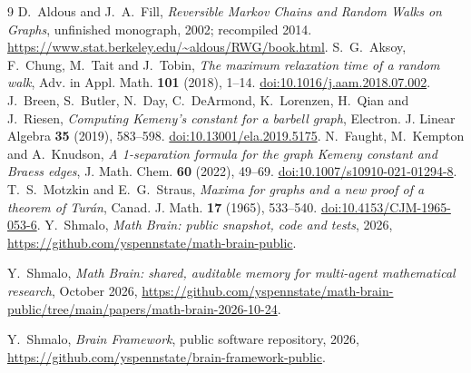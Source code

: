 \documentclass[11pt]{amsart}
\numberwithin{equation}{section}
\theoremstyle{remark}
\begin{document}
\begin{thebibliography}{9}
D.~Aldous and J.~A.~Fill, \emph{Reversible Markov Chains and Random Walks on Graphs}, unfinished monograph, 2002; recompiled 2014. \url{https://www.stat.berkeley.edu/~aldous/RWG/book.html}.
S.~G.~Aksoy, F.~Chung, M.~Tait and J.~Tobin, \emph{The maximum relaxation time of a random walk}, Adv. in Appl. Math. \textbf{101} (2018), 1--14. \href{https://doi.org/10.1016/j.aam.2018.07.002}{doi:10.1016/j.aam.2018.07.002}.
J.~Breen, S.~Butler, N.~Day, C.~DeArmond, K.~Lorenzen, H.~Qian and J.~Riesen, \emph{Computing Kemeny's constant for a barbell graph}, Electron. J. Linear Algebra \textbf{35} (2019), 583--598. \href{https://doi.org/10.13001/ela.2019.5175}{doi:10.13001/ela.2019.5175}.
N.~Faught, M.~Kempton and A.~Knudson, \emph{A 1-separation formula for the graph Kemeny constant and Braess edges}, J. Math. Chem. \textbf{60} (2022), 49--69. \href{https://doi.org/10.1007/s10910-021-01294-8}{doi:10.1007/s10910-021-01294-8}.
T.~S.~Motzkin and E.~G.~Straus, \emph{Maxima for graphs and a new proof of a theorem of Tur\'an}, Canad. J. Math. \textbf{17} (1965), 533--540. \href{https://doi.org/10.4153/CJM-1965-053-6}{doi:10.4153/CJM-1965-053-6}.
 Y.~Shmalo, \emph{Math Brain: public snapshot, code and tests}, 2026, \url{https://github.com/yspennstate/math-brain-public}.

 Y.~Shmalo, \emph{Math Brain: shared, auditable memory for multi-agent mathematical research}, October 2026, \url{https://github.com/yspennstate/math-brain-public/tree/main/papers/math-brain-2026-10-24}.

 Y.~Shmalo, \emph{Brain Framework}, public software repository, 2026, \url{https://github.com/yspennstate/brain-framework-public}.

\end{thebibliography}
\end{document}
